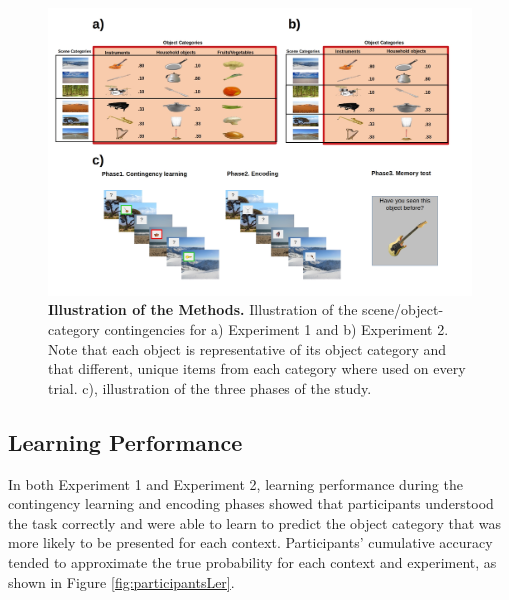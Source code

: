 \documentclass[a4paper,12pt]{article}
\begin{document}
\begin{figure}[ht!]
\centerline
{\includegraphics[width=1.3\textwidth]{figures/methods.All.jpg}}
\caption{\textbf{Illustration of the Methods.} Illustration of the scene/object-category contingencies  for a) Experiment 1 and b) Experiment 2. Note that each object is representative of its object category and that different, unique items from each category where used on every trial. c), illustration of the three phases of the study. }
\label{fig:Methods}
\end{figure}

\subsection{Learning Performance}
In both Experiment 1 and Experiment 2, learning performance during the contingency learning and encoding phases showed that participants understood the task correctly and were able to learn to predict the object category that was more likely to be presented for each context. Participants’ cumulative accuracy tended to approximate the true probability for each context and experiment, as shown in Figure \ref{fig:participantsLer}.
\end{document}
